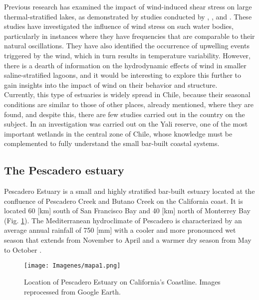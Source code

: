 \documentclass[tesis.tex]{subfiles}
\begin{document}
Previous research has examined the impact of wind-induced shear stress on large thermal-stratified lakes, as demonstrated by studies conducted by \cite{Coman2012}, \cite{Laval2008}, and \cite{avalos2019natural}. These studies have investigated the influence of wind stress on such water bodies, particularly in instances where they have frequencies that are comparable to their natural oscillations. They have also identified the occurrence of upwelling events triggered by the wind, which in turn results in temperature variability. However, there is a dearth of information on the hydrodynamic effects of wind in smaller saline-stratified lagoons, and it would be interesting to explore this further to gain insights into the impact of wind on their behavior and structure.\\

Currently, this type of estuaries is widely spread in Chile, because their seasonal conditions are similar to those of other places, already mentioned, where they are found, and despite this, there are few studies carried out in the country on the subject. In \cite{dussaillant2009} an investigation was carried out on the Yali reserve, one of the most important wetlands in the central zone of Chile, whose knowledge must be complemented to fully understand the small bar-built coastal systems.\\

\subsection{The Pescadero estuary}

Pescadero Estuary is a small and highly stratified bar-built estuary located at the confluence of Pescadero Creek and Butano Creek on the California coast. It is located 60 [km] south of San Francisco Bay and 40 [km] north of Monterrey Bay (Fig. \ref{fig:locPDO}). The Mediterranean hydroclimate of Pescadero is characterized by an average annual rainfall of 750 [mm] with a cooler and more pronounced wet season that extends from November to April and a warmer dry season from May to October  \citep{climatedata2021}.\\

\begin{figure}[h!]
\centering
\texttt{[image: Imagenes/mapa1.png]}
\caption{Location of Pescadero Estuary on California's Coastline. Images reprocessed from Google Earth.}
\label{fig:locPDO}
\end{figure}
\end{document}
